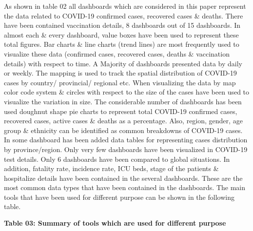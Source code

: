 \documentclass[
]{article}
\begin{document}
As shown in table 02 all dashboards which are considered in this paper
represent the data related to COVID-19 confirmed cases, recovered cases
\& deaths. There have been contained vaccination details, 8 dashboards
out of 15 dashboards. In almost each \& every dashboard, value boxes
have been used to represent these total figures. Bar charts \& line
charts (trend lines) are most frequently used to visualize these data
(confirmed cases, recovered cases, deaths \& vaccination details) with
respect to time. A Majority of dashboards presented data by daily or
weekly. The mapping is used to track the spatial distribution of
COVID-19 cases by country/ provincial/ regional etc. When visualizing
the data by map color code system \& circles with respect to the size of
the cases have been used to visualize the variation in size. The
considerable number of dashboards has been used doughnut shape pie
charts to represent total COVID-19 confirmed cases, recovered cases,
active cases \& deaths as a percentage. Also, region, gender, age group
\& ethnicity can be identified as common breakdowns of COVID-19 cases.
In some dashboard has been added data tables for representing cases
distribution by province/region. Only very few dashboards have been
visualized in COVID-19 test details. Only 6 dashboards have been
compared to global situations. In addition, fatality rate, incidence
rate, ICU beds, stage of the patients \& hospitalize details have been
contained in the several dashboards. These are the most common data
types that have been contained in the dashboards. The main tools that
have been used for different purpose can be shown in the following
table.\hfill\break

\textbf{Table 03: Summary of tools which are used for different purpose}
\end{document}
